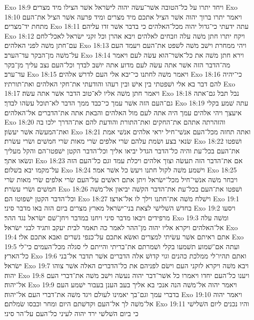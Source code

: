 Exo 18:9  ויחד יתרו על כל־הטובה אשׁר־עשׂה יהוה לישׂראל אשׁר הצילו מיד מצרים׃
Exo 18:10  ויאמר יתרו ברוך יהוה אשׁר הציל אתכם מיד מצרים ומיד פרעה אשׁר הציל את־העם מתחת יד־מצרים׃
Exo 18:11  עתה ידעתי כי־גדול יהוה מכל־האלהים כי בדבר אשׁר זדו עליהם׃
Exo 18:12  ויקח יתרו חתן משׁה עלה וזבחים לאלהים ויבא אהרן וכל זקני ישׂראל לאכל־לחם עם־חתן משׁה לפני האלהים׃
Exo 18:13  ויהי ממחרת וישׁב משׁה לשׁפט את־העם ויעמד העם על־משׁה מן־הבקר עד־הערב׃
Exo 18:14  וירא חתן משׁה את כל־אשׁר־הוא עשׂה לעם ויאמר מה־הדבר הזה אשׁר אתה עשׂה לעם מדוע אתה יושׁב לבדך וכל־העם נצב עליך מן־בקר עד־ערב׃
Exo 18:15  ויאמר משׁה לחתנו כי־יבא אלי העם לדרשׁ אלהים׃
Exo 18:16  כי־יהיה להם דבר בא אלי ושׁפטתי בין אישׁ ובין רעהו והודעתי את־חקי האלהים ואת־תורתיו׃
Exo 18:17  ויאמר חתן משׁה אליו לא־טוב הדבר אשׁר אתה עשׂה׃
Exo 18:18  נבל תבל גם־אתה גם־העם הזה אשׁר עמך כי־כבד ממך הדבר לא־תוכל עשׂהו לבדך׃
Exo 18:19  עתה שׁמע בקלי איעצך ויהי אלהים עמך היה אתה לעם מול האלהים והבאת אתה את־הדברים אל־האלהים׃
Exo 18:20  והזהרתה אתהם את־החקים ואת־התורת והודעת להם את־הדרך ילכו בה ואת־המעשׂה אשׁר יעשׂון׃
Exo 18:21  ואתה תחזה מכל־העם אנשׁי־חיל יראי אלהים אנשׁי אמת שׂנאי בצע ושׂמת עלהם שׂרי אלפים שׂרי מאות שׂרי חמשׁים ושׂרי עשׂרת׃
Exo 18:22  ושׁפטו את־העם בכל־עת והיה כל־הדבר הגדל יביאו אליך וכל־הדבר הקטן ישׁפטו־הם והקל מעליך ונשׂאו אתך׃
Exo 18:23  אם את־הדבר הזה תעשׂה וצוך אלהים ויכלת עמד וגם כל־העם הזה על־מקמו יבא בשׁלום׃
Exo 18:24  וישׁמע משׁה לקול חתנו ויעשׂ כל אשׁר אמר׃
Exo 18:25  ויבחר משׁה אנשׁי־חיל מכל־ישׂראל ויתן אתם ראשׁים על־העם שׂרי אלפים שׂרי מאות שׂרי חמשׁים ושׂרי עשׂרת׃
Exo 18:26  ושׁפטו את־העם בכל־עת את־הדבר הקשׁה יביאון אל־משׁה וכל־הדבר הקטן ישׁפוטו הם׃
Exo 18:27  וישׁלח משׁה את־חתנו וילך לו אל־ארצו׃
Exo 19:1  בחדשׁ השׁלישׁי לצאת בני־ישׂראל מארץ מצרים ביום הזה באו מדבר סיני׃
Exo 19:2  ויסעו מרפידים ויבאו מדבר סיני ויחנו במדבר ויחן־שׁם ישׂראל נגד ההר׃
Exo 19:3  ומשׁה עלה אל־האלהים ויקרא אליו יהוה מן־ההר לאמר כה תאמר לבית יעקב ותגיד לבני ישׂראל׃
Exo 19:4  אתם ראיתם אשׁר עשׂיתי למצרים ואשׂא אתכם על־כנפי נשׁרים ואבא אתכם אלי׃
Exo 19:5  ועתה אם־שׁמוע תשׁמעו בקלי ושׁמרתם את־בריתי והייתם לי סגלה מכל־העמים כי־לי כל־הארץ׃
Exo 19:6  ואתם תהיו־לי ממלכת כהנים וגוי קדושׁ אלה הדברים אשׁר תדבר אל־בני ישׂראל׃
Exo 19:7  ויבא משׁה ויקרא לזקני העם וישׂם לפניהם את כל־הדברים האלה אשׁר צוהו יהוה׃
Exo 19:8  ויענו כל־העם יחדו ויאמרו כל אשׁר־דבר יהוה נעשׂה וישׁב משׁה את־דברי העם אל־יהוה׃
Exo 19:9  ויאמר יהוה אל־משׁה הנה אנכי בא אליך בעב הענן בעבור ישׁמע העם בדברי עמך וגם־בך יאמינו לעולם ויגד משׁה את־דברי העם אל־יהוה׃
Exo 19:10  ויאמר יהוה אל־משׁה לך אל־העם וקדשׁתם היום ומחר וכבסו שׂמלתם׃
Exo 19:11  והיו נכנים ליום השׁלישׁי כי ביום השׁלשׁי ירד יהוה לעיני כל־העם על־הר סיני׃
